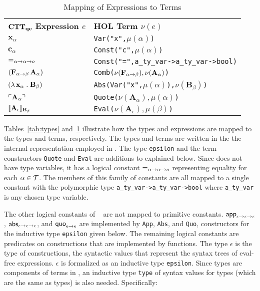\documentclass[fleqn]{llncs}
\begin{document}
\begin{table}[t]
\bc
\begin{tabular}{|ll|}
\hline
\textbf{${\bf CTT_{qe}}$ Expression $e$} \hspace*{2ex}
  & \textbf{HOL Term $\nu(e)$}\\
$\textbf{x}_\alpha$
  & \texttt{Var("x",\mbox{$\mu(\alpha)$})}\\
$\textbf{c}_\alpha$
  & \texttt{Const("c",\mbox{$\mu(\alpha)$})}\\
$\mbox{\sf =}_{\alpha \rightarrow \alpha \rightarrow o}$
  & \texttt{Const("=",\texttt{a\_ty\_var->a\_ty\_var->bool})}\\
$(\textbf{F}_{\alpha \rightarrow \beta} \, \textbf{A}_\alpha)$
  & \texttt{Comb(\mbox{\rm $\nu(\textbf{F}_{\alpha \rightarrow \beta}),\nu(\textbf{A}_\alpha)$})}\\
$(\lambda\, \textbf{x}_\alpha \mathrel. \textbf{B}_\beta)$
  & \texttt{Abs(Var("x",\mbox{$\mu(\alpha)$}),\mbox{\rm $\nu(\textbf{B}_\beta)$})}\\
$\ulcorner\textbf{A}_\alpha\urcorner$
  & \texttt{Quote(\mbox{\rm $\nu(\textbf{A}_\alpha),\mu(\alpha)$})}\\
$\llbracket\textbf{A}_\epsilon\rrbracket_{{\bf B}_\beta}$
  & \texttt{Eval(\mbox{\rm $\nu(\textbf{A}_\epsilon),\mu(\beta)$})}\\
\hline
\end{tabular}
\ec
\caption{Mapping of {\churchqe} Expressions to {\HOL} Terms}\label{tab:expressions} 
\end{table}

Tables~\ref{tab:types} and~\ref{tab:expressions} illustrate how the
{\churchqe} types and expressions are mapped to the {\HOL} types and
terms, respectively.  The {\HOL} types and terms are written in the
the internal representation employed in {\HLQE}.  The type
\texttt{epsilon} and the term constructors \texttt{Quote} and
\texttt{Eval} are additions to {\HL} explained below.  Since
{\churchqe} does not have type variables, it has a logical constant
$\mbox{\sf =}_{\alpha \rightarrow \alpha \rightarrow o}$ representing equality
for each $\alpha \in \mbox{$\cal T$}$.  The members of this family of constants
are all mapped to a single {\HOL} constant with the polymorphic type
\texttt{a\_ty\_var->a\_ty\_var->bool} where \texttt{a\_ty\_var} is any
chosen {\HOL} type variable.  

The other logical constants of {\churchqe}~\cite[Table 1]{Farmer18}
are not mapped to primitive {\HOL} constants.  $\mbox{\sf app}_{\epsilon
  \rightarrow \epsilon \rightarrow \epsilon}$, $\mbox{\sf abs}_{\epsilon \rightarrow
  \epsilon \rightarrow \epsilon}$, and $\mbox{\sf quo}_{\epsilon \rightarrow
  \epsilon}$ are implemented by \texttt{App}, \texttt{Abs}, and
\texttt{Quo}, constructors for the inductive type \texttt{epsilon}
given below.  The remaining logical constants are predicates on
constructions that are implemented by {\HOL} functions.
The {\churchqe} type $\epsilon$ is the type of constructions, the
syntactic values that represent the syntax trees of eval-free
expressions.  $\epsilon$ is formalized as an inductive type
\texttt{epsilon}.  Since types are components of terms in
{\HL}, an inductive type \texttt{type} of syntax values for
{\HLQE} types (which are the same as {\HOL} types) is also
needed.  Specifically:
\end{document}
